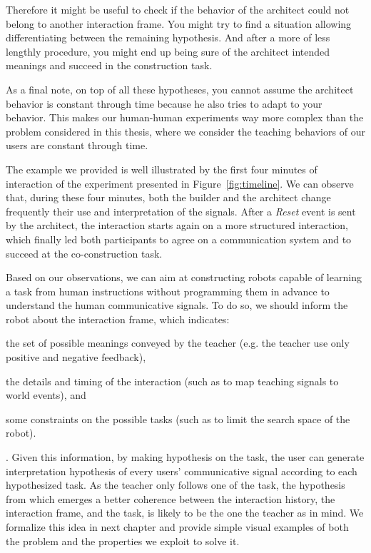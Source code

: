 Therefore it might be useful to check if the behavior of the architect could not belong to another interaction frame. You might try to find a situation allowing differentiating between the remaining hypothesis. And after a more of less lengthly procedure, you might end up being sure of the architect intended meanings and succeed in the construction task.

As a final note, on top of all these hypotheses, you cannot assume the architect behavior is constant through time because he also tries to adapt to your behavior. This makes our human-human experiments way more complex than the problem considered in this thesis, where we consider the teaching behaviors of our users are constant through time.

The example we provided is well illustrated by the first four minutes of interaction of the experiment presented in Figure~\ref{fig:timeline}. We can observe that, during these four minutes, both the builder and the architect change frequently their use and interpretation of the signals. After a \emph{Reset} event is sent by the architect, the interaction starts again on a more structured interaction, which finally led both participants to agree on a communication system and to succeed at the co-construction task.

\transition

Based on our observations, we can aim at constructing robots capable of learning a task from human instructions without programming them in advance to understand the human communicative signals. To do so, we should inform the robot about the interaction frame, which indicates: \begin{inparaenum}[(a)] \item the set of possible meanings conveyed by the teacher (e.g. the teacher use only positive and negative feedback), \item the details and timing of the interaction (such as to map teaching signals to world events), and \item some constraints on the possible tasks (such as to limit the search space of the robot). \end{inparaenum}. Given this information, by making hypothesis on the task, the user can generate interpretation hypothesis of every users' communicative signal according to each hypothesized task. As the teacher only follows one of the task, the hypothesis from which emerges a better coherence between the interaction history, the interaction frame, and the task, is likely to be the one the teacher as in mind. We formalize this idea in next chapter and provide simple visual examples of both the problem and the properties we exploit to solve it.



